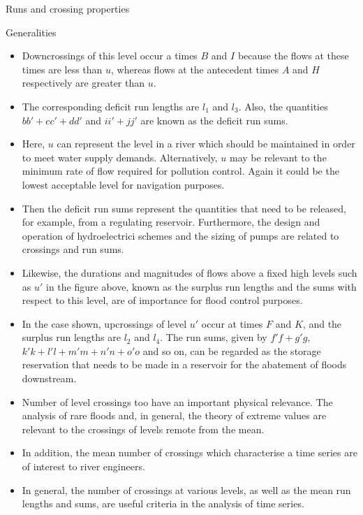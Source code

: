 \documentclass[8pt]{beamer}
\renewcommand{\emph}[1]{\textcolor{myorange}{#1}}
\begin{document}
\begin{frame}{Runs and crossing properties}
    \vspace{-2pt}
    \begin{block}{Generalities}
    \end{block}
    \vspace{-5pt}
    \begin{itemize}
        \item Downcrossings of this level occur a times $B$ and $I$ because the flows at these times are less than $u$, whereas flows at the antecedent times $A$ and $H$ respectively are greater than $u$. 
    \item The corresponding  deficit  \emph{run lengths} are $l_1$ and $l_3$. Also, the quantities $bb' + cc' + dd'$ and  $ii' + jj'$ are known as the \emph{deficit run sums}.
    \item Here, $u$ can represent the \emph{level  in a river } which should be maintained in order to meet \emph{water supply demands}. Alternatively, $u$ may be relevant to the minimum \emph{rate of flow} required for \emph{pollution control}.  Again it could be the lowest acceptable \emph{level for navigation purposes}. 
    \item Then the \emph{deficit run sums} represent the quantities that need to be released, for example, from a \emph{regulating reservoir}. Furthermore, the design and operation of hydroelectrici schemes and the \emph{sizing of pumps} are related to \emph{crossings} and \emph{run sums}.  
    \item Likewise, the durations and magnitudes of flows above a fixed high levels such as $u'$ in the figure above, known as the surplus \emph{run lengths} and the \emph{sums} with respect to this level, are of importance for flood control purposes. 
    \item In the case shown, upcrossings of level $u'$  occur at times $F$ and $K$, and the surplus \emph{run lengths} are $l_2$ and $l_4$. The \emph{run sums}, given  by $f'f + g'g$, $k'k + l'l + m'm + n'n + o'o$ and so on, can be regarded as the storage reservation that needs to be made in a reservoir for the abatement of floods downstream. 
    \item Number of \emph{level crossings} too have an important physical relevance. The analysis of rare floods and, in general, the theory  of \emph{extreme values} are relevant to the crossings of levels remote from the mean. 
    \item In addition, the \emph{mean number of crossings} which characterise a time series are of interest to river engineers. 
    \item In general, the number of crossings at various levels, as well as the \emph{mean run lengths and sums}, are useful criteria in the analysis of time series.
    \end{itemize}
\end{frame}
\end{document}
